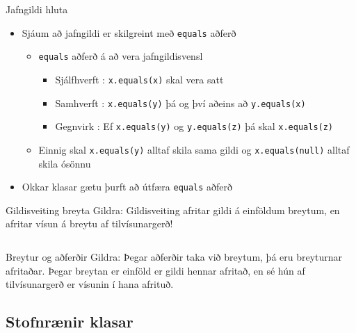 \documentclass{beamer}
\begin{document}
\begin{frame}{Jafngildi hluta}
\begin{itemize}
 \item Sjáum að jafngildi er skilgreint með \texttt{equals} aðferð
 \begin{itemize}
  \item \texttt{equals} aðferð á að vera jafngildisvensl 
  \begin{itemize}
   \item Sjálfhverft : \texttt{x.equals(x)} skal vera satt
   \item Samhverft : \texttt{x.equals(y)} þá og því aðeins að \texttt{y.equals(x)}
   \item Gegnvirk : Ef \texttt{x.equals(y)} og \texttt{y.equals(z)} þá skal \texttt{x.equals(z)}
  \end{itemize}
  \item Einnig skal \texttt{x.equals(y)} alltaf skila sama gildi og \texttt{x.equals(null)} alltaf skila ósönnu
 \end{itemize}
 \item Okkar klasar gætu þurft að útfæra \texttt{equals} aðferð
\end{itemize}
\end{frame}


\begin{frame}{Gildisveiting breyta}
Gildra: Gildisveiting afritar gildi á einföldum breytum, en afritar vísun á breytu af tilvísunargerð!

\begin{columns}
\end{columns}
\end{frame}

\begin{frame}{Breytur og aðferðir}
Gildra: Þegar aðferðir taka við breytum, þá eru breyturnar afritaðar. Þegar breytan er einföld er gildi hennar afritað, en sé hún af tilvísunargerð er vísunin í hana afrituð.

\end{frame}

\subsection{Stofnrænir klasar}
\end{document}
